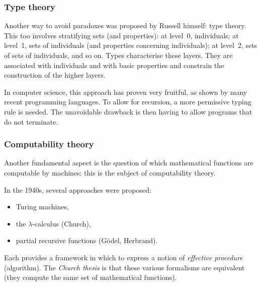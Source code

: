 \documentclass[compress,dvipdfmx]{beamer}
\begin{document}
%
\begin{frame}
\frametitle{Type theory}

Another way to avoid paradoxes was proposed by Russell himself: type
theory. This too involves stratifying sets (and properties): at
level~0, individuals; at level~1, sets of individuals (and
properties concerning individuals); at level~2, sets of sets of
individuals, and so on. Types characterise these layers. They are
associated with individuals and with basic properties and constrain
the construction of the higher layers.

\bigskip

In computer science, this approach has proven very fruitful, as
shown by many recent programming languages. To allow for recursion,
a more permissive typing rule is needed. The unavoidable drawback is
then having to allow programs that do not terminate.

\end{frame}

%
\begin{frame}
\frametitle{Computability theory}

Another fundamental aspect is the question of which mathematical
functions are computable by machines: this is the subject of
computability theory.

\bigskip

In the 1940s, several approaches were proposed:
\begin{itemize}

  \item Turing machines,

  \item the $\lambda$-calculus (Church),

  \item partial recursive functions (Gödel, Herbrand).

\end{itemize}
Each provides a framework in which to express a notion of
\emph{effective procedure} (algorithm). The \emph{Church thesis} is
that these various formalisms are equivalent (they compute the same
set of mathematical functions).

\end{frame}
\end{document}
